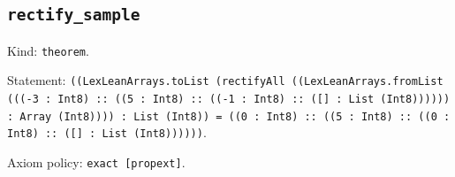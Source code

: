 \documentclass[11pt]{article}
\begin{document}
\subsection*{\texttt{rectify\_sample}}
\noindent Kind: \texttt{theorem}.\par
\noindent Statement: \texttt{((LexLeanArrays.toList (rectifyAll ((LexLeanArrays.fromList (((-3 : Int8) :: ((5 : Int8) :: ((-1 : Int8) :: ([] : List (Int8)))))) : Array (Int8)))) : List (Int8)) = ((0 : Int8) :: ((5 : Int8) :: ((0 : Int8) :: ([] : List (Int8))))))}.\par
\noindent Axiom policy: \texttt{exact [propext]}.\par
\end{document}
